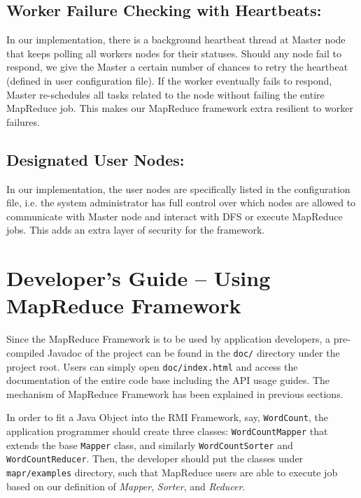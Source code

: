 \documentclass{article} %
\begin{document}
\subsection{Worker Failure Checking with Heartbeats:}
    \par\qquad In our implementation, there is a background heartbeat thread at Master node that keeps polling all workers nodes for their statuses. Should any node fail to respond, we give the Master a certain number of chances to retry the heartbeat (defined in user configuration file). If the worker eventually fails to respond, Master re-schedules all tasks related to the node without failing the entire MapReduce job. This makes our MapReduce framework extra resilient to worker failures.
\subsection{Designated User Nodes:}
    \par\qquad In our implementation, the user nodes are specifically listed in the configuration file, i.e. the system administrator has full control over which nodes are allowed to communicate with Master node and interact with DFS or execute MapReduce jobs. This adds an extra layer of security for the framework.


\section{Developer's Guide -- Using MapReduce Framework}

\par\qquad Since the MapReduce Framework is to be used by application developers, a pre-compiled Javadoc of the project can be found in the \texttt{doc/} directory under the project root. Users can simply open \texttt{doc/index.html} and access the documentation of the entire code base including the API usage guides. The mechanism of MapReduce Framework has been explained in previous sections.

\par\qquad In order to fit a Java Object into the RMI Framework, say, \texttt{WordCount}, the application programmer should create three classes: \texttt{WordCountMapper} that extends the base \texttt{Mapper} class, and similarly \texttt{WordCountSorter} and \texttt{WordCountReducer}. Then, the developer should put the classes under \texttt{mapr/examples} directory, such that MapReduce users are able to execute job based on our definition of \emph{Mapper}, \emph{Sorter}, and \emph{Reducer}.
\end{document}

